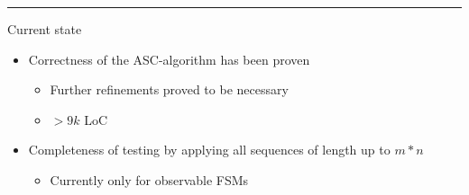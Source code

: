 \documentclass[aspectratio=169]{beamer}
\begin{document}
\begin{frame}
\hrule{}

\centering

\end{frame}





\begin{frame}{Current state}
\begin{itemize}
	\item Correctness of the ASC-algorithm has been proven
	\begin{itemize}
		\item Further refinements proved to be necessary
		\item $>9k$ LoC
	\end{itemize}
  
    \item Completeness of testing by applying all sequences of length up to $m*n$ 
    \begin{itemize}
    	\item Currently only for observable FSMs
    \end{itemize}
\end{itemize}
\end{frame}
\end{document}
